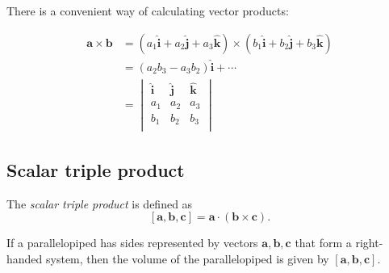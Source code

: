 \documentclass[a4paper]{article}
\begin{document}
There is a convenient way of calculating vector products:
\begin{prop}
  \begin{align*}
    \mathbf{a\times b} &= (a_1\hat{\mathbf{i}} + a_2\hat{\mathbf{j}} + a_3\hat{\mathbf{k}})\times(b_1\hat{\mathbf{i}} + b_2\hat{\mathbf{j}} + b_3\hat{\mathbf{k}})\\
    &= (a_2b_3 - a_3b_2)\hat{\mathbf{i}} + \cdots\\
    &= \begin{vmatrix} \hat{\mathbf{i}} & \hat{\mathbf{j}} & \hat{\mathbf{k}}\\
      a_1 & a_2 & a_3\\
      b_1 & b_2 & b_3\\
    \end{vmatrix}
  \end{align*}
\end{prop}

\subsection{Scalar triple product}
\begin{defi}
  The \emph{scalar triple product} is defined as
  \[
    \mathbf{[a, b, c] = a\cdot (b\times c)}.
  \]
\end{defi}

\begin{prop}
  If a parallelopiped has sides represented by vectors $\mathbf{a, b, c}$ that form a right-handed system, then the volume of the parallelopiped is given by $\mathbf{[a, b, c]}$.
\end{prop}
\begin{center}
\end{center}
\end{document}
